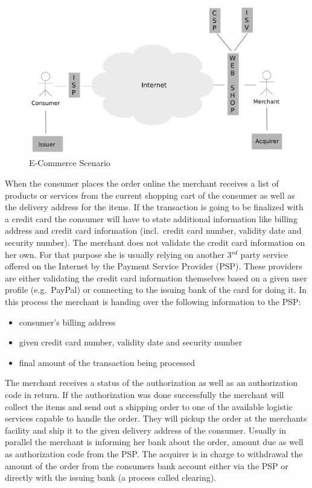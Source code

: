 \begin{figure}[H]
	\centering
		\includegraphics[width=0.8\columnwidth]{images/e-commerce-scenario.pdf}
	\caption{E-Commerce Scenario}
\label{fig:images_ecommerce_scenario}
\end{figure}

When the consumer places the order online the merchant receives a list of products or services from the current shopping cart of the consumer as well as the delivery address for the items.
If the transaction is going to be finalized with a credit card the consumer will have to state additional information like billing address and credit card information (incl.\ credit card number, validity date and security number).
The merchant does not validate the credit card information on her own. For that purpose she is usually relying on another 3$^{rd}$ party service offered on the Internet by the Payment Service Provider (PSP).
These providers are either validating the credit card information themselves based on a given user profile (e.g.\ PayPal) or connecting to the issuing bank of the card for doing it. In this process the merchant is
handing over the following information to the PSP:\@

\begin{itemize}
    \item consumer's billing address
    \item given credit card number, validity date and security number
    \item final amount of the transaction being processed
\end{itemize}

The merchant receives a status of the authorization as well as an authorization code in return. If the authorization was done successfully the merchant will collect the items and send out a shipping order to one of the available logistic
services capable to handle the order. They will pickup the order at the merchants facility and ship it to the given delivery address of the consumer. Usually in parallel the merchant is informing her bank about the order, amount due as well as
authorization code from the PSP. The acquirer is in charge to withdrawal the amount of the order from the consumers bank account either via the PSP or directly with the issuing bank (a process called clearing).\@

